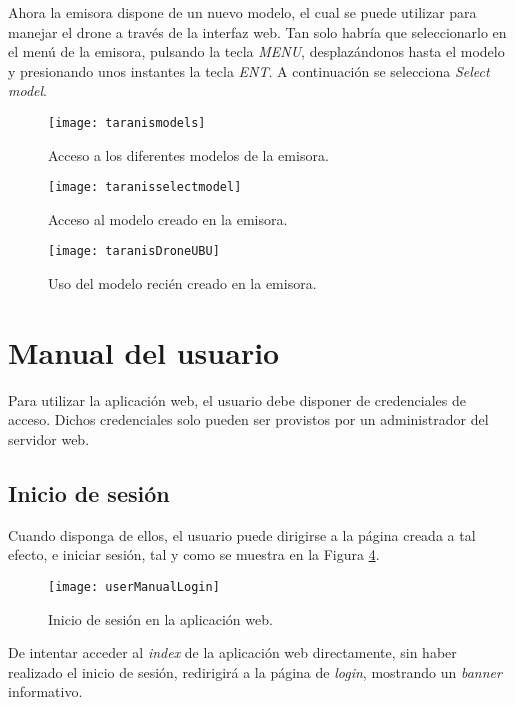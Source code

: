 Ahora la emisora dispone de un nuevo modelo, el cual se puede utilizar para manejar el drone a través de la interfaz web. Tan solo habría que seleccionarlo en el menú de la emisora, pulsando la tecla \emph{MENU}, desplazándonos hasta el modelo y presionando unos instantes la tecla \emph{ENT}. A continuación se selecciona \emph{Select model}.
\begin{figure}[H]
	\centering
	\texttt{[image: taranismodels]}
	\caption[Acceso a modelos de la emisora.]{Acceso a los diferentes modelos de la emisora.}\label{fig:taranismodels}
\end{figure}

\begin{figure}[H]
	\centering
	\texttt{[image: taranisselectmodel]}
	\caption[Acceso a modelo creado en la emisora.]{Acceso al modelo creado en la emisora.}\label{fig:taranisselectmodel}
\end{figure}

\begin{figure}[H]
	\centering
	\texttt{[image: taranisDroneUBU]}
	\caption[Uso de modelo creado en la emisora.]{Uso del modelo recién creado en la emisora.}\label{fig:taranisDroneUBU}
\end{figure}


\section{Manual del usuario}

Para utilizar la aplicación web, el usuario debe disponer de credenciales de acceso. Dichos credenciales solo pueden ser provistos por un administrador del servidor web. 

\subsection{Inicio de sesión}
\label{subsec:login}
Cuando disponga de ellos, el usuario puede dirigirse a la página creada a tal efecto, e iniciar sesión, tal y como se muestra en la Figura \ref{fig:userManualLogin}.


\begin{figure}[H]
	\centering
	\texttt{[image: userManualLogin]}
	\caption[Inicio de sesión en la aplicación web.]{Inicio de sesión en la aplicación web.}\label{fig:userManualLogin}
\end{figure}

De intentar acceder al \emph{index} de la aplicación web directamente, sin haber realizado el inicio de sesión, redirigirá a la página de \emph{login}, mostrando un \emph{banner} informativo.

